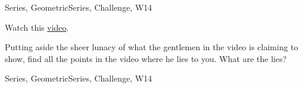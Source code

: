 \begin{tagblock}{Series, GeometricSeries, Challenge, W14}
\begin{question}

Watch this \href{https://www.youtube.com/watch?v=E-d9mgo8FGk}{video}.

\bigskip

Putting aside the sheer lunacy of what the gentlemen in the video is claiming to show, find all the points in the video where he lies to you. What are the lies?
	
	
\begin{tags}
	    Series, GeometricSeries, Challenge, W14
\end{tags}
	
\begin{diary}
	    
\end{diary}
	
\begin{solution}
	   
\end{solution}
	
\end{question}

\end{tagblock}

 


